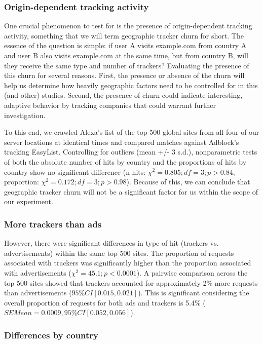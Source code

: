 \documentclass[journal]{IEEEtran}
\begin{document}
\subsubsection{Origin-dependent tracking activity }

One crucial phenomenon to test for is the presence of origin-dependent tracking activity, something that we will term geographic tracker churn for short. The essence of the question is simple: if user A visits example.com from country A and user B also visits example.com at the same time, but from country B, will they receive the same type and number of trackers? Evaluating the presence of this churn for several reasons. First, the presence or absence of the churn will help us determine how heavily geographic factors need to be controlled for in this (and other) studies. Second, the presence of churn could indicate interesting, adaptive behavior by tracking companies that could warrant further investigation.

To this end, we crawled Alexa's list of the top 500 global sites from all four of our server locations at identical times and compared matches against Adblock's tracking EasyList. Controlling for outliers (mean +/- 3 s.d.), nonparametric tests of both the absolute number of hits by country and the proportions of hits by country show no significant difference (n hits: $\chi^{2}=0.805; df=3; p>0.84$, proportion: $\chi^{2}=0.172; df=3; p>0.98$). Because of this, we can conclude that geographic tracker churn will not be a significant factor for us within the scope of our experiment.

\subsubsection{More trackers than ads}
However, there were significant differences in type of hit (trackers vs. advertisements) within the same top 500 sites. The proportion of requests associated with trackers was significantly higher than the proportion associated with advertisements ($\chi^{2}=45.1; p<0.0001$). A pairwise comparison across the top 500 sites showed that trackers accounted for approximately 2\% more requests than advertisements ($95\% CI [0.015, 0.021]$). This is significant considering the overall proportion of requests for both ads and trackers is 5.4\% ($SEMean = 0.0009, 95\% CI [0.052, 0.056]$).

\subsubsection{Differences by country}
\end{document}
